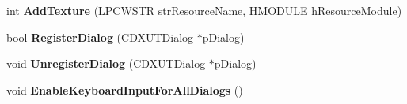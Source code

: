 \begin{DoxyCompactItemize}
\item 
\hypertarget{class_c_d_x_u_t_dialog_resource_manager_a3f9d7c4c960b1e30a52f900283afa786}{int {\bfseries Add\+Texture} (L\+P\+C\+W\+S\+T\+R str\+Resource\+Name, H\+M\+O\+D\+U\+L\+E h\+Resource\+Module)}\label{class_c_d_x_u_t_dialog_resource_manager_a3f9d7c4c960b1e30a52f900283afa786}

\item 
\hypertarget{class_c_d_x_u_t_dialog_resource_manager_a316e3fb9e1a6a5115b4e7e0e94952150}{bool {\bfseries Register\+Dialog} (\hyperlink{class_c_d_x_u_t_dialog}{C\+D\+X\+U\+T\+Dialog} $\ast$p\+Dialog)}\label{class_c_d_x_u_t_dialog_resource_manager_a316e3fb9e1a6a5115b4e7e0e94952150}

\item 
\hypertarget{class_c_d_x_u_t_dialog_resource_manager_a82c0f8904b95862f2bcf6c6231b7c75f}{void {\bfseries Unregister\+Dialog} (\hyperlink{class_c_d_x_u_t_dialog}{C\+D\+X\+U\+T\+Dialog} $\ast$p\+Dialog)}\label{class_c_d_x_u_t_dialog_resource_manager_a82c0f8904b95862f2bcf6c6231b7c75f}

\item 
\hypertarget{class_c_d_x_u_t_dialog_resource_manager_a8733abc35a666eefd8a673eb587fb6e8}{void {\bfseries Enable\+Keyboard\+Input\+For\+All\+Dialogs} ()}\label{class_c_d_x_u_t_dialog_resource_manager_a8733abc35a666eefd8a673eb587fb6e8}

\end{DoxyCompactItemize}
